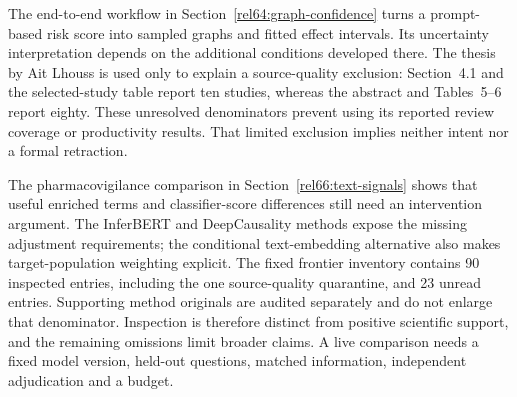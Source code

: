 The end-to-end workflow in Section~\ref{rel64:graph-confidence} turns a
prompt-based risk score into sampled graphs and fitted effect intervals. Its
uncertainty interpretation depends on the additional conditions developed
there. The thesis by Ait Lhouss is used only to explain a source-quality
exclusion: Section~4.1 and the selected-study table report ten studies, whereas
the abstract and Tables~5--6 report eighty. These unresolved denominators
prevent using its reported review coverage or productivity results. That
limited exclusion implies neither intent nor a formal retraction.
\citep{rel64molero,rel64aitlhouss}

The pharmacovigilance comparison in Section~\ref{rel66:text-signals} shows
that useful enriched terms and classifier-score differences still need an
intervention argument. The InferBERT and DeepCausality methods expose the
missing adjustment requirements; the conditional text-embedding alternative
also makes target-population weighting explicit. The fixed frontier inventory
contains 90 inspected entries, including the one source-quality quarantine,
and 23 unread entries. Supporting method originals are audited separately
and do not enlarge that denominator. Inspection is therefore distinct from
positive scientific support, and the remaining omissions limit broader claims.
A live comparison needs a fixed model version, held-out questions, matched
information, independent adjudication and a budget. \citep{rel66pharma,rel66inferbert,rel66deepcausality,rel66veitch}





